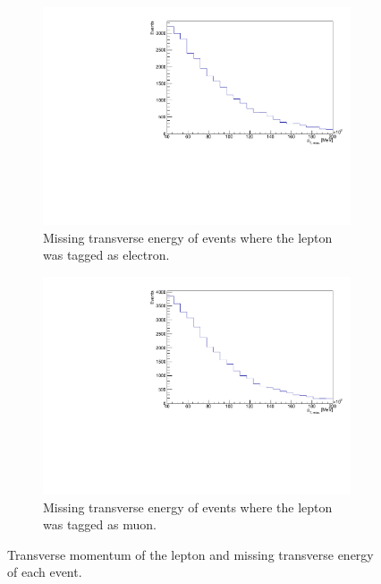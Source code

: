 \begin{figure}[H]
  \begin{subfigure}{0.48\textwidth}%
    \centering%
    \includegraphics[width=\textwidth]{plots/ttbar_distributions/ttbar.el_met_et.pdf}%
    \caption{Missing transverse energy of events where the lepton was tagged as electron.}%
    \label{fig:2c}%
  \end{subfigure}%
  \hfill
  \begin{subfigure}{0.48\textwidth}%
    \centering%
    \includegraphics[width=\textwidth]{plots/ttbar_distributions/ttbar.mu_met_et.pdf}%
    \caption{Missing transverse energy of events where the lepton was tagged as muon.}%
    \label{fig:2d}%
  \end{subfigure}%
  \caption{Transverse momentum of the lepton and missing transverse energy of each event.}%
  \label{fig:2}%
\end{figure}


